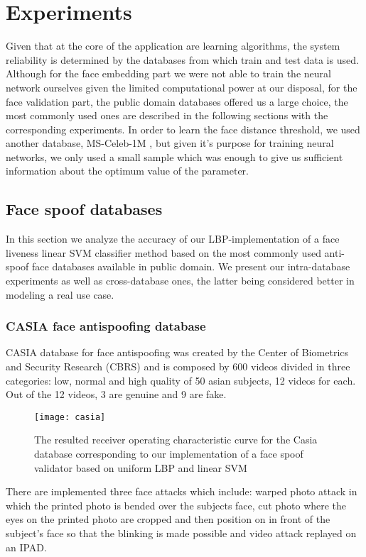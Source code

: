 \chapter{Experiments}
Given that at the core of the application are learning algorithms, the system reliability is determined by the databases from which train and test data is used. Although for the face embedding part we were not able to train the neural network ourselves given the limited computational power at our disposal, for the face validation part, the public domain databases offered us a large choice, the most commonly used ones are described in the following sections with the corresponding experiments. In order to learn the face distance threshold, we used another database, MS-Celeb-1M \cite{guo2016msceleb}, but given it's purpose for training neural networks, we only used a small sample which was enough to give us sufficient information about the optimum value of the parameter.
\section{Face spoof databases}\label{section:face_spoof_databases}
In this section we analyze the accuracy of our LBP-implementation of a face liveness linear SVM classifier method based on the most commonly used anti-spoof face databases available in public domain. We present our intra-database experiments as well as cross-database ones, the latter being considered better in modeling a real use case.
\subsection{CASIA face antispoofing database }
CASIA database for face antispoofing was created by the Center of Biometrics and Security Research (CBRS) and is composed by 600 videos divided in three categories: low, normal and high quality of 50 asian subjects, 12 videos for each. Out of the 12 videos, 3 are genuine and 9 are fake.
\begin{wrapfigure}{r}{10cm}
	\captionsetup{width=10cm,font=small}
	\texttt{[image: casia]}
	\caption[CASIA database reported ROC curve]{The resulted receiver operating characteristic curve for the Casia database corresponding to our implementation of a face spoof validator based on uniform LBP and linear SVM}
	\label{fig:casia_roc}
\end{wrapfigure}

There are implemented three face attacks which include: warped photo attack in which the printed photo is bended over the subjects face, cut photo where the eyes on the printed photo are cropped and then position on in front of the subject's face so that the blinking is made possible and video attack replayed on an IPAD.

